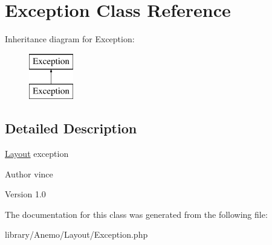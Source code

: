 \hypertarget{class_anemo_1_1_layout_1_1_exception}{
\section{Exception Class Reference}
\label{class_anemo_1_1_layout_1_1_exception}
}
Inheritance diagram for Exception:\begin{figure}[H]
\begin{center}
\leavevmode
\includegraphics[height=2.000000cm]{class_anemo_1_1_layout_1_1_exception}
\end{center}
\end{figure}


\subsection{Detailed Description}
\hyperlink{class_anemo_1_1_layout}{Layout} exception \begin{DoxyAuthor}{Author}
vince 
\end{DoxyAuthor}
\begin{DoxyVersion}{Version}
1.0 
\end{DoxyVersion}


The documentation for this class was generated from the following file:\begin{DoxyCompactItemize}
\item 
library/Anemo/Layout/Exception.php\end{DoxyCompactItemize}
